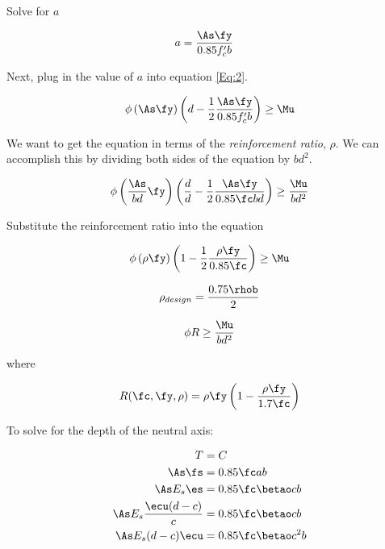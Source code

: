 Solve for $a$

\begin{align}
	a&=\frac{\As \fy}{0.85f'_cb}
\end{align}


Next, plug in the value of $a$ into equation \ref{Eq:2}.

\begin{align}
	\phi
	\left(\As \fy\right)
	\left(d-\frac{1}{2}\frac{\As \fy}{0.85f'_cb}\right)
	\geq
	\Mu
\end{align}

We want to get the equation in terms of the \textit{reinforcement ratio}, $\rho$. We can accomplish this by dividing both sides of the equation by $bd^2$.


\begin{align}
	\phi
	\left(\frac{\As}{bd} \fy\right)
	\left(\frac{d}{d} - \frac12\frac{\As\fy}{0.85\fc bd}\right)
	\geq
	\frac{\Mu}{bd^2}
\end{align}


Substitute the reinforcement ratio into the equation

\begin{align}
	\phi
	\left(\rho \fy\right)
	\left(1 - \frac12\frac{\rho \fy}{0.85 \fc}\right)
	\geq
	\Mu
\end{align}


\begin{align}
	\rho_{design}=\frac{0.75\rhob}{2}
\end{align}


\begin{align}
	\phi R \geq \frac{\Mu}{bd^2}
	\label{Eq:design2}
\end{align}

where

\begin{align}
	R(\fc,\fy,\rho) = 
	\rho \fy 
	\left(1-\frac{\rho\fy}{1.7\fc}\right)
\end{align}



To solve for the depth of the neutral axis:

\begin{align}
	T &= C\\
	\As\fs &=0.85\fc a b\\ 
	\As E_s \es &= 0.85\fc \betao c b\\
	\As E_s \frac{\ecu(d-c)}{c} &= 0.85\fc \betao c b\\
	\As E_s (d-c) \ecu &= 0.85 \fc \betao c^2 b
\end{align}

